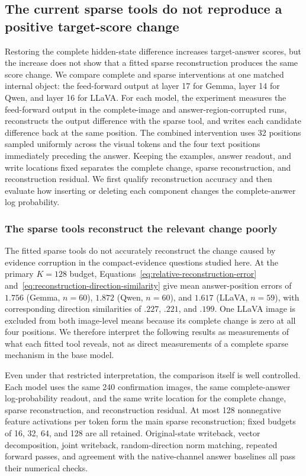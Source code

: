 \subsection{The current sparse tools do not reproduce a positive target-score change}
\label{sec:sparse-effect}

Restoring the complete hidden-state difference increases target-answer scores, but the increase does not show that a fitted sparse reconstruction produces the same score change. We compare complete and sparse interventions at one matched internal object: the feed-forward output at layer 17 for Gemma, layer 14 for Qwen, and layer 16 for LLaVA. For each model, the experiment measures the feed-forward output in the complete-image and answer-region-corrupted runs, reconstructs the output difference with the sparse tool, and writes each candidate difference back at the same position. The combined intervention uses 32 positions sampled uniformly across the visual tokens and the four text positions immediately preceding the answer. Keeping the examples, answer readout, and write locations fixed separates the complete change, sparse reconstruction, and reconstruction residual. We first qualify reconstruction accuracy and then evaluate how inserting or deleting each component changes the complete-answer log probability.

\subsubsection{The sparse tools reconstruct the relevant change poorly}

The fitted sparse tools do not accurately reconstruct the change caused by evidence corruption in the compact-evidence questions studied here. At the primary $K=128$ budget, Equations~\ref{eq:relative-reconstruction-error} and~\ref{eq:reconstruction-direction-similarity} give mean answer-position errors of $1.756$ (Gemma, $n=60$), $1.872$ (Qwen, $n=60$), and $1.617$ (LLaVA, $n=59$), with corresponding direction similarities of $.227$, $.221$, and $.199$. One LLaVA image is excluded from both image-level means because its complete change is zero at all four positions. We therefore interpret the following results as measurements of what each fitted tool reveals, not as direct measurements of a complete sparse mechanism in the base model.

Even under that restricted interpretation, the comparison itself is well controlled. Each model uses the same 240 confirmation images, the same complete-answer log-probability readout, and the same write location for the complete change, sparse reconstruction, and reconstruction residual. At most 128 nonnegative feature activations per token form the main sparse reconstruction; fixed budgets of 16, 32, 64, and 128 are all retained. Original-state writeback, vector decomposition, joint writeback, random-direction norm matching, repeated forward passes, and agreement with the native-channel answer baselines all pass their numerical checks.

